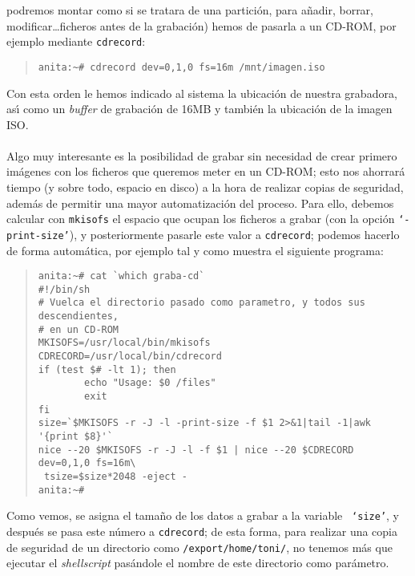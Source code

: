 podremos montar como si se tratara de una partici\'on, para a\~nadir, borrar,
modificar\ldots ficheros antes de la grabaci\'on) hemos de pasarla a un CD-ROM,
por ejemplo mediante {\tt cdrecord}:
\begin{quote}
\begin{verbatim}
anita:~# cdrecord dev=0,1,0 fs=16m /mnt/imagen.iso
\end{verbatim}
\end{quote}
Con esta orden le hemos indicado al sistema la ubicaci\'on de nuestra grabadora,
as\'{\i} como un {\it buffer} de grabaci\'on de 16MB y tambi\'en la ubicaci\'on
de la imagen ISO.\\
\\Algo muy interesante es la posibilidad de grabar sin necesidad de crear 
primero im\'agenes con los ficheros que queremos meter en un CD-ROM; esto nos
ahorrar\'a tiempo (y sobre todo, espacio en disco) a la hora de realizar 
copias de seguridad, adem\'as de permitir una mayor automatizaci\'on del 
proceso. Para ello, debemos calcular con {\tt mkisofs} el espacio que ocupan los
ficheros a grabar (con la opci\'on {\tt `-print-size'}), y posteriormente
pasarle este valor a {\tt cdrecord}; podemos hacerlo de forma autom\'atica,
por ejemplo tal y como muestra el siguiente programa:
\begin{quote}
\begin{verbatim}
anita:~# cat `which graba-cd`
#!/bin/sh
# Vuelca el directorio pasado como parametro, y todos sus descendientes,
# en un CD-ROM
MKISOFS=/usr/local/bin/mkisofs
CDRECORD=/usr/local/bin/cdrecord
if (test $# -lt 1); then
        echo "Usage: $0 /files"
        exit
fi
size=`$MKISOFS -r -J -l -print-size -f $1 2>&1|tail -1|awk '{print $8}'` 
nice --20 $MKISOFS -r -J -l -f $1 | nice --20 $CDRECORD dev=0,1,0 fs=16m\
 tsize=$size*2048 -eject -
anita:~#
\end{verbatim}
\end{quote}
Como vemos, se asigna el tama\~no de los datos a grabar a la variable {\tt 
`size'}, y despu\'es se pasa este n\'umero a {\tt cdrecord}; de esta forma, 
para 
realizar una copia de seguridad de un directorio como {\tt /export/home/toni/},
no tenemos m\'as que ejecutar el {\it shellscript} pas\'andole el nombre de
este directorio como par\'ametro.
